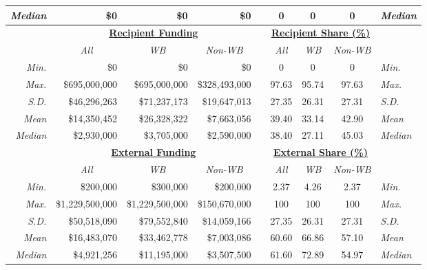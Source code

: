 \documentclass{article}
\begin{document}
\begin{singlespace}
\begin{table}[H]
{\begin{tabular}{rrrrlcccl}
			\textit{Median} & \$0 & \$0 & \$0 &  & 0 & 0 & 0 & \textit{Median} \\ \hline
			\multicolumn{1}{c}{{\ul \textit{\textbf{}}}} & \multicolumn{3}{c}{{\ul \textbf{Recipient Funding}}} & \multicolumn{1}{c}{{\ul \textbf{}}} & \multicolumn{3}{c}{{\ul \textbf{Recipient Share (\%)}}} & \multicolumn{1}{c}{{\ul \textit{\textbf{}}}} \\
			\multicolumn{1}{c}{} & \multicolumn{1}{c}{\textit{All}} & \multicolumn{1}{c}{\textit{WB}} & \multicolumn{1}{c}{\textit{Non-WB}} & \multicolumn{1}{c}{\textit{}} & \textit{All} & \textit{WB} & \textit{Non-WB} & \multicolumn{1}{c}{} \\
			\textit{Min.} & \$0 & \$0 & \$0 &  & 0 & 0 & 0 & \textit{Min.} \\
			\textit{Max.} & \$695,000,000 & \$695,000,000 & \$328,493,000 &  & 97.63 & 95.74 & 97.63 & \textit{Max.} \\
			\textit{S.D.} & \$46,296,263 & \$71,237,173 & \$19,647,013 &  & 27.35 & 26.31 & 27.31 & \textit{S.D.} \\
			\textit{Mean} & \$14,350,452 & \$26,328,322 & \$7,663,056 &  & 39.40 & 33.14 & 42.90 & \textit{Mean} \\
			\textit{Median} & \$2,930,000 & \$3,705,000 & \$2,590,000 &  & 38.40 & 27.11 & 45.03 & \textit{Median} \\ \hline
			\multicolumn{1}{c}{{\ul \textit{\textbf{}}}} & \multicolumn{3}{c}{{\ul \textbf{External Funding}}} & \multicolumn{1}{c}{{\ul \textbf{}}} & \multicolumn{3}{c}{{\ul \textbf{External Share (\%)}}} & \multicolumn{1}{c}{{\ul \textit{\textbf{}}}} \\
			\multicolumn{1}{c}{} & \multicolumn{1}{c}{\textit{All}} & \multicolumn{1}{c}{\textit{WB}} & \multicolumn{1}{c}{\textit{Non-WB}} & \multicolumn{1}{c}{\textit{}} & \textit{All} & \textit{WB} & \textit{Non-WB} & \multicolumn{1}{c}{} \\
			\textit{Min.} & \$200,000 & \$300,000 & \$200,000 &  & 2.37 & 4.26 & 2.37 & \textit{Min.} \\
			\textit{Max.} & \$1,229,500,000 & \$1,229,500,000 & \$150,670,000 &  & 100 & 100 & 100 & \textit{Max.} \\
			\textit{S.D.} & \$50,518,090 & \$79,552,840 & \$14,059,166 &  & 27.35 & 26.31 & 27.31 & \textit{S.D.} \\
			\textit{Mean} & \$16,483,070 & \$33,462,778 & \$7,003,086 &  & 60.60 & 66.86 & 57.10 & \textit{Mean} \\
			\textit{Median} & \$4,921,256 & \$11,195,000 & \$3,507,500 &  & 61.60 & 72.89 & 54.97 & \textit{Median} \\ \hline
		\end{tabular}%
	}
\end{table}
\end{singlespace}
\end{document}
